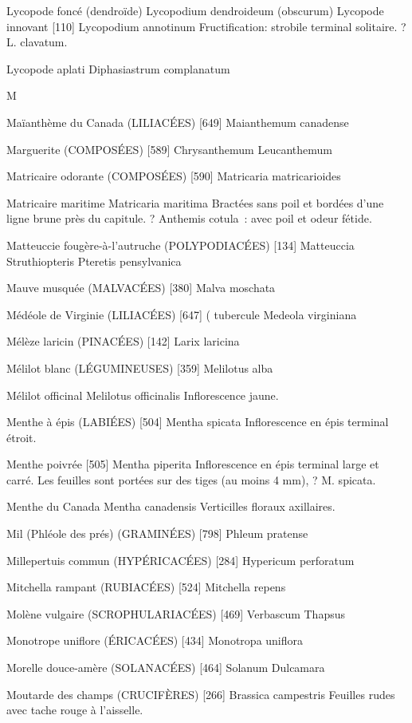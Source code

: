 \documentclass[book,12pt,a4paper,onecolumn,openany]{memoir}
\begin{document}
Lycopode foncé (dendroïde) 
				Lycopodium dendroideum (obscurum)
Lycopode innovant  [110]
				Lycopodium annotinum
Fructification: strobile terminal solitaire.
? L. clavatum.

Lycopode aplati
				Diphasiastrum complanatum

M

Maïanthème du Canada (LILIACÉES)  [649]
				Maianthemum canadense

Marguerite (COMPOSÉES)  [589]
				Chrysanthemum Leucanthemum

Matricaire odorante (COMPOSÉES)  [590]
				Matricaria matricarioides

Matricaire maritime
				Matricaria maritima
Bractées sans poil et bordées d’une ligne brune près du capitule.
? Anthemis cotula : avec poil et odeur fétide.

Matteuccie fougère-à-l’autruche (POLYPODIACÉES)  [134]
				Matteuccia Struthiopteris
				Pteretis pensylvanica

Mauve musquée (MALVACÉES)  [380]
				Malva moschata

Médéole de Virginie (LILIACÉES)  [647]			( tubercule
				Medeola virginiana

Mélèze laricin (PINACÉES) [142]
				Larix laricina

Mélilot blanc (LÉGUMINEUSES)  [359]
				Melilotus alba

Mélilot officinal
				Melilotus officinalis
Inflorescence jaune.

Menthe à épis (LABIÉES)  [504]
				Mentha spicata
Inflorescence en épis terminal étroit.

Menthe poivrée  [505]
				Mentha piperita
Inflorescence en épis terminal large et carré. Les feuilles sont portées sur des tiges (au moins 4 mm), ? M. spicata.

Menthe du Canada
				Mentha canadensis
Verticilles floraux axillaires.

Mil (Phléole des prés) (GRAMINÉES)  [798]
				Phleum pratense

Millepertuis commun (HYPÉRICACÉES)  [284]
				Hypericum perforatum

Mitchella rampant (RUBIACÉES)  [524]
				Mitchella repens

Molène vulgaire (SCROPHULARIACÉES)  [469]
				Verbascum Thapsus

Monotrope uniflore (ÉRICACÉES)  [434]
				Monotropa uniflora

Morelle douce-amère (SOLANACÉES)  [464]
				Solanum Dulcamara

Moutarde des champs (CRUCIFÈRES)  [266]
				Brassica campestris
Feuilles rudes avec tache rouge à l’aisselle.
\end{document}
